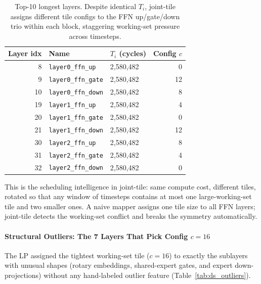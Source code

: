 \begin{table}[ht!]
\centering
\caption{Top-10 longest layers. Despite identical $T_i$, joint-tile assigns
different tile configs to the FFN up/gate/down trio within each block, staggering working-set pressure across timesteps.}
\label{tab:ds_ffn_stagger}
\begin{tabular}{rllr}
\toprule
\textbf{Layer idx} & \textbf{Name} &
\textbf{$T_i$ (cycles)} & \textbf{Config $c$} \\
\midrule
 8 & \texttt{layer0\_ffn\_up}   & 2{,}580{,}482 &  0 \\
 9 & \texttt{layer0\_ffn\_gate} & 2{,}580{,}482 & 12 \\
10 & \texttt{layer0\_ffn\_down} & 2{,}580{,}482 &  8 \\
19 & \texttt{layer1\_ffn\_up}   & 2{,}580{,}482 &  4 \\
20 & \texttt{layer1\_ffn\_gate} & 2{,}580{,}482 &  0 \\
21 & \texttt{layer1\_ffn\_down} & 2{,}580{,}482 & 12 \\
30 & \texttt{layer2\_ffn\_up}   & 2{,}580{,}482 &  8 \\
31 & \texttt{layer2\_ffn\_gate} & 2{,}580{,}482 &  4 \\
32 & \texttt{layer2\_ffn\_down} & 2{,}580{,}482 &  0 \\
\bottomrule
\end{tabular}
\end{table}

This is the scheduling intelligence in joint-tile: same compute cost, different tiles, rotated so that any window of timesteps contains at most one large-working-set tile and two smaller ones.
A naive mapper assigns one tile size to all FFN layers; joint-tile detects the working-set conflict and breaks the symmetry automatically.

\paragraph{Structural Outliers: The 7 Layers That Pick Config $c=16$}

The LP assigned the tightest working-set tile ($c = 16$) to exactly the sublayers with unusual shapes (rotary embeddings, shared-expert gates, and expert down-projections) without any hand-labeled outlier feature (Table~\ref{tab:ds_outliers}).

